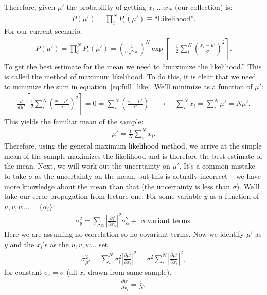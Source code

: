 \documentclass{article}
\begin{document}
Therefore, given $\mu'$ the probability of getting $x_1\, ...\, x_N$ (our collection) is:
\begin{align}
  P(\mu') = \prod_i^N P_i(\mu') \equiv \text{``Likelihood''}.
  \label{eq:like}
\end{align}
For our current scenario:
\begin{align}
  P(\mu') = \prod_i^N P_i(\mu') = \left(\frac{1}{\sigma\sqrt{2\pi}}\right)^N\exp\left[-\frac{1}{2}\sum_i^N \left(\frac{x_i-\mu'}{\sigma}\right)^2\right].
  \label{eq:full_like}
\end{align}
To get the best estimate for the mean we need to ``maximize the likelihood.'' This is called the method of maximum likelihood. To do this, it is clear that we need to minimize the sum in equation~\ref{eq:full_like}. We'll minimize as a function of $\mu'$:
\begin{align*}
  \frac{d}{d\mu'}\left[\frac{1}{2}\sum_i^N\left(\frac{x-\mu'}{\sigma}\right)^2\right] = 0 = \sum_i^N\left(\frac{x_i-\mu'}{\sigma^2}\right) \quad \rightarrow \quad \sum_i^N x_i = \sum_i^N \mu' = N\mu'.
\end{align*}
This yields the familiar mean of the sample:
\begin{align}
  \mu' = \frac{1}{N}\sum_i^Nx_i.
  \label{eq:main_mean}
\end{align}
Therefore, using the general maximum likelihood method, we arrive at the simple mean of the sample maximizes the likelihood and is therefore the best estimate of the mean. Next, we will work out the uncertainty on $\mu'$. It's a common mistake to take $\sigma$ as the uncertainty on the mean, but this is actually incorrect -- we have more knowledge about the mean than that (the uncertainty is less than $\sigma$). We'll take our error propagation from lecture one. For some variable $y$ as a function of $u,v,w... = \{\alpha_i\}$:
\begin{align}
  \sigma_y^2 = \sum_{\alpha} \left|\frac{\partial f}{\partial x_{\alpha}}\right|^2\sigma_{\alpha}^2 + \text{ covariant terms}.
\end{align}
Here we are assuming no correlation so no covariant terms. Now we identify $\mu'$ as $y$ and the $x_i$'s as the $u,v,w...$ set.
\begin{align*}
  \sigma_{\mu'}^2 = \sum_i^N \sigma_i^2 \left|\frac{\partial \mu'}{\partial x_i}\right|^2 =  \sigma^2\sum_i^N \left|\frac{\partial \mu'}{\partial x_i}\right|^2,
\end{align*}
for constant $\sigma_i = \sigma$ (all $x_i$ drawn from same sample).
\begin{align*}
  \frac{\partial \mu'}{\partial x_i} = \frac{1}{N},
\end{align*}
\end{document}
